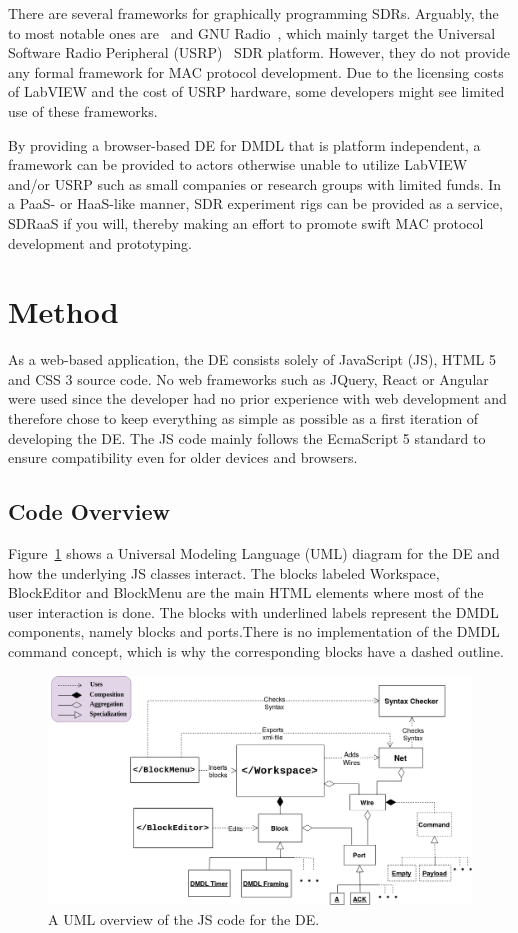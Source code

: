\documentclass[journal,comsoc]{IEEEtran}
\begin{document}
There are several frameworks for graphically programming SDRs. Arguably, the to most notable
ones are~\cite{labview} and GNU Radio~\cite{gr}, which mainly target the
Universal Software Radio Peripheral (USRP)~\cite{usrp} SDR platform. However, they do not
provide any formal framework for MAC protocol development. Due to the licensing costs of LabVIEW
and the cost of USRP hardware, some developers might see limited use of these frameworks.

By providing a browser-based DE for DMDL that is platform independent, a framework can be provided
to actors otherwise unable to utilize LabVIEW and/or USRP such as small companies or research
groups with limited funds. In a PaaS- or HaaS-like manner, SDR experiment rigs can be provided as a
service, SDRaaS if you will, thereby making an effort to promote swift MAC protocol development and
prototyping.

\section{Method}
As a web-based application, the DE consists solely of JavaScript (JS), HTML 5 and CSS 3 source
code. No web frameworks such as JQuery, React or Angular were used since the developer had no
prior experience with web development and therefore chose to keep everything as simple as possible
as a first iteration of developing the DE. The JS code mainly follows the EcmaScript 5 standard to
ensure compatibility even for older devices and browsers.

\subsection{Code Overview}
Figure~\ref{fig:uml} shows a Universal Modeling Language (UML) diagram for the DE and how the
underlying JS classes interact. The blocks labeled Workspace, BlockEditor and BlockMenu are the
main HTML elements where most of the user interaction is done. The blocks with underlined labels
represent the DMDL components, namely blocks and ports.There is no implementation of the DMDL
command concept, which is why the corresponding blocks have a dashed outline.
\begin{figure}[!t]
\centering
\includegraphics[width=\columnwidth]{dmdl-editor.png}
\caption{A UML overview of the JS code for the DE.}
\label{fig:uml}
\end{figure}
\end{document}
